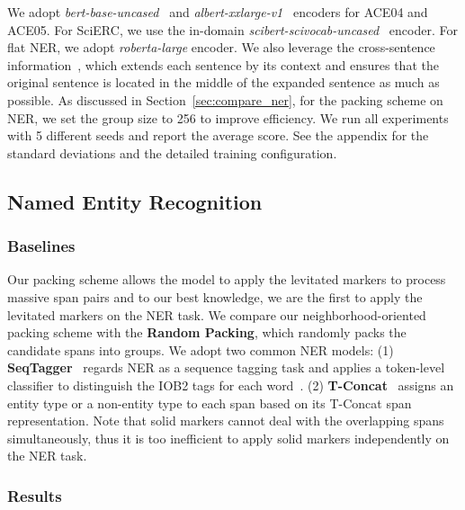 \documentclass[11pt]{article}
\begin{document}
We adopt \emph{bert-base-uncased}~\cite{BERT}  and \emph{albert-xxlarge-v1}~\cite{albert}  encoders for ACE04 and ACE05. For SciERC, we  use the in-domain \emph{scibert-scivocab-uncased}~\cite{scibert}  encoder. For flat NER, we adopt \emph{roberta-large} encoder.  
We also leverage the cross-sentence information~\cite{DyGIE, crosssentencener}, which extends each sentence by its context and ensures that the original sentence is located in the middle of the expanded sentence as much as possible. 
As discussed in Section~\ref{sec:compare_ner}, for the packing scheme on NER,  we set the group size to 256 to improve efficiency. 
We run all experiments with 5 different seeds and report the average score. See the appendix for the standard deviations and the detailed training configuration.






















\subsection{Named Entity Recognition}

\subsubsection{Baselines}
Our packing scheme allows the model to apply the levitated markers to process massive span pairs and to our best knowledge, we are the first to apply the levitated markers on the NER task. We compare our neighborhood-oriented packing scheme with the \textbf{Random Packing}, which randomly packs the candidate spans into groups. We adopt two common NER models: (1) \textbf{SeqTagger}~\cite{BERT} regards NER as a sequence tagging task and applies a token-level classifier to distinguish the IOB2 tags for each word~\cite{BIO}. 
(2) \textbf{T-Concat}~\cite{Generalspan, PURE}  assigns an entity type or a non-entity type to each span based on its T-Concat span representation. 
Note that solid markers cannot deal with the overlapping spans simultaneously, thus it is too inefficient to apply solid markers independently on the NER task.

\subsubsection{Results}
\end{document}
